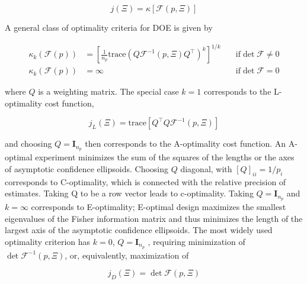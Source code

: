 \documentclass[../Article_Design_of_Experiment.tex]{subfiles}
\begin{document}
	{\footnotesize
	\begin{equation}
		j(\Xi) = \kappa\left[ \mathcal{F}(p, \Xi) \right]
	\end{equation} }
	
	
	A general class of optimality criteria for DOE is given by
	
	{\footnotesize
	\begin{align}
		\kappa_k(\mathcal{F}(p)) &= \left[\frac{1}{n_p} \text{trace}\left( Q\mathcal{F}^{-1}(p, \Xi) Q^\top \right)^k \right]^{1/k} \quad &\text{if} \det \mathcal{F} \neq 0 \nonumber \\
		\kappa_k(\mathcal{F}(p)) &= \infty \quad &\text{if} \det \mathcal{F} = 0
	\end{align} }
	
	where $Q$ is a weighting matrix. The special case $k = 1$ corresponds to the L-optimality cost function,
	
	{\footnotesize
	\begin{equation}
		j_L(\Xi) = \text{trace} \left[ Q^\top Q\mathcal{F}^{-1}(p,\Xi) \right]
	\end{equation} }
	
	and choosing $Q = \textbf{I}_{n_p}$ then corresponds to the A-optimality cost function. An A-optimal experiment minimizes the sum of the squares of the lengths or the axes of asymptotic confidence ellipsoids. Choosing $Q$ diagonal, with $[Q]_{ii} = 1/p_i$ corresponds to C-optimality, which is connected with the relative precision of estimates. Taking Q to be a row vector leads to c-optimality. Taking $Q = \textbf{I}_{n_p}$ and $k = \infty$ corresponds to E-optimality; E-optimal design maximizes the smallest eigenvalues of the Fisher information matrix and thus minimizes the length of the largest axis of the asymptotic confidence ellipsoids. The most widely used optimality criterion has $k = 0$, $Q = \textbf{I}_{n_p}$ , requiring minimization of $\det \mathcal{F}^{-1}(p, \Xi)$, or, equivalently, maximization of
	
	{\footnotesize
	\begin{equation}
		j_D(\Xi) = \det \mathcal{F}(p, \Xi)
	\end{equation} }
	
\end{document}
